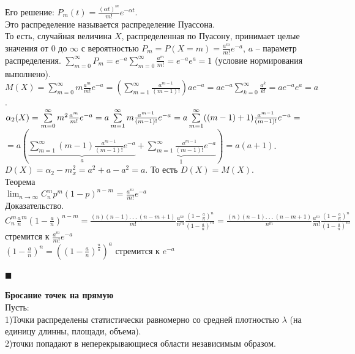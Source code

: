 \documentclass[russian, 12pt, fleqn,x11names]{article}
\begin{document}
Его решение: $P_m(t) = \frac{(\alpha t)^m}{m!} e^{-\alpha t}$.\\
Это распределение называется распределение Пуассона.\\
То есть, случайная величина $X$, распределенная по Пуасону, принимает целые значения от $0$ до $\infty$ с вероятностью $P_m=P(X=m) = \frac{a^m}{m!}e^{-a}$, $a$ -- параметр распределения. $\sum\limits_{m=0}^{\infty}P_m = e^{-a}\sum\limits_{m=0}^{\infty} \frac{a^m}{m!}  = e^{-a}e^a = 1$  (условие нормирования выполнено).
$M(X) = \sum\limits_{m=0}^{\infty} m\frac{a^m}{m!}e^{-a} = (\sum\limits_{m=1}^{\infty} \frac{a^{m-1}}{(m-1)!})ae^{-a} = ae^{-a}\sum\limits_{k=0}^{\infty} \frac{a^k}{k!} = ae^{-a}e^{a} = a$.\\
$\alpha_2(X) = \sum\limits_{m=0}^{\infty} m^2\frac{a^m}{m!}e^{-a} = a\sum\limits_{m=1}^{\infty} m\frac{a^{m-1}}{(m-1)!}e^{-a} = a \sum\limits_{m=1}^{\infty} ((m-1)+1)\frac{a^{m-1}}{(m-1)!}e^{-a} =\\$ $\displaystyle{ = a \left ( \underbrace{ \sum\limits_{m=1}^{\infty}(m-1)\frac{a^{m-1}}{(m-1)!}e^{-a}}_{a} + \underbrace{ \sum\limits_{m=1}^{\infty}\frac{a^{m-1}}{(m-1)!}e^{-a}}_{1} \right )=a(a+1)}$.\\
$D(X) = \alpha_2 - m_x^2 = a^2 + a - a^2 = a$. То есть $D(X)=M(X)$.\\
$\textbf{Теорема}$\\
$\displaystyle{\lim_{n \to {\infty}}  C^m_np^m(1-p)^{n-m}}$ = $\frac{a^m}{m!}e^{-a}$\\
Доказательство.\\
$C^m_n\frac{a}{n}^m(1-\frac{a}{n})^{n-m} = \frac{(n)(n-1).\ .\ .\ (n-m+1)}{m!} \frac{a^m}{n^m} \frac{(1-\frac{a}{n})^n}{(1-\frac{a}{n})^m} = 
\frac{(n)(n-1).\ .\ .\ (n-m+1)}{n^m}  \frac{a^m}{m!} \frac{(1-\frac{a}{n})^n}{(1-\frac{a}{n})^m}$  \\стремится к $\frac{a^m}{m!} e^{-a}$\\
$(1-\frac{a}{n})^n = ((1-\frac{a}{n})^\frac{n}{a})^a$ стремится к $e^{-a}$\\
\begin{flushright}\(\blacksquare\)\end{flushright}
\textbf{Бросание точек на прямую}\\
Пусть: \\
1)Точки распределены статистически равномерно со средней плотностью $\lambda$ (на единицу длинны, площади, объема).\\
2)точки попадают в неперекрывающиеся области независимым образом.\\
\end{document}
